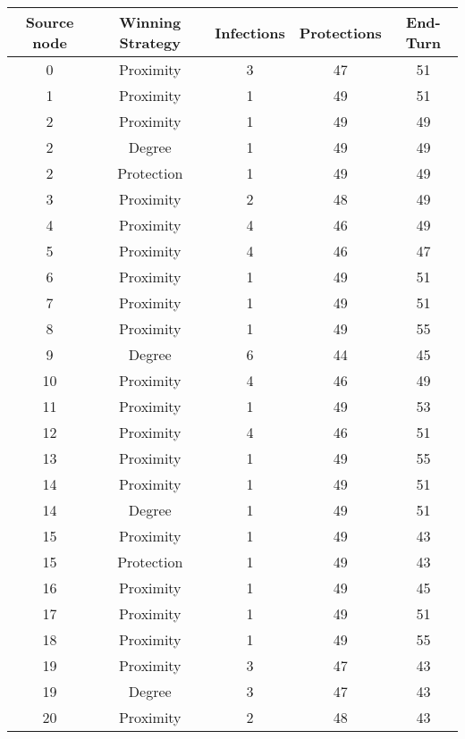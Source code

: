 \documentclass[results.tex]{subfiles}
\begin{document}
\begin{center}
  \begin{tabular}{| c || c | c | c | c |}
    \hline
    {\bfseries Source node} & {\bfseries Winning Strategy} & {\bfseries Infections} & {\bfseries Protections} & {\bfseries End-Turn} \\  %
    \hline\hline
    0 & Proximity & 3 & 47 & 51 \\ 
    \hline
    1 & Proximity & 1 & 49 & 51 \\ 
    \hline
    2 & Proximity & 1 & 49 & 49 \\ 
    \hline
    2 & Degree & 1 & 49 & 49 \\ 
    \hline
    2 & Protection & 1 & 49 & 49 \\ 
    \hline
    3 & Proximity & 2 & 48 & 49 \\ 
    \hline
    4 & Proximity & 4 & 46 & 49 \\ 
    \hline
    5 & Proximity & 4 & 46 & 47 \\ 
    \hline
    6 & Proximity & 1 & 49 & 51 \\ 
    \hline
    7 & Proximity & 1 & 49 & 51 \\ 
    \hline
    8 & Proximity & 1 & 49 & 55 \\ 
    \hline
    9 & Degree & 6 & 44 & 45 \\ 
    \hline
    10 & Proximity & 4 & 46 & 49 \\ 
    \hline
    11 & Proximity & 1 & 49 & 53 \\ 
    \hline
    12 & Proximity & 4 & 46 & 51 \\ 
    \hline
    13 & Proximity & 1 & 49 & 55 \\ 
    \hline
    14 & Proximity & 1 & 49 & 51 \\ 
    \hline
    14 & Degree & 1 & 49 & 51 \\ 
    \hline
    15 & Proximity & 1 & 49 & 43 \\ 
    \hline
    15 & Protection & 1 & 49 & 43 \\ 
    \hline
    16 & Proximity & 1 & 49 & 45 \\ 
    \hline
    17 & Proximity & 1 & 49 & 51 \\ 
    \hline
    18 & Proximity & 1 & 49 & 55 \\ 
    \hline
    19 & Proximity & 3 & 47 & 43 \\ 
    \hline
    19 & Degree & 3 & 47 & 43 \\ 
    \hline
    20 & Proximity & 2 & 48 & 43 \\ 

\end{tabular}
\end{center}
\end{document}
